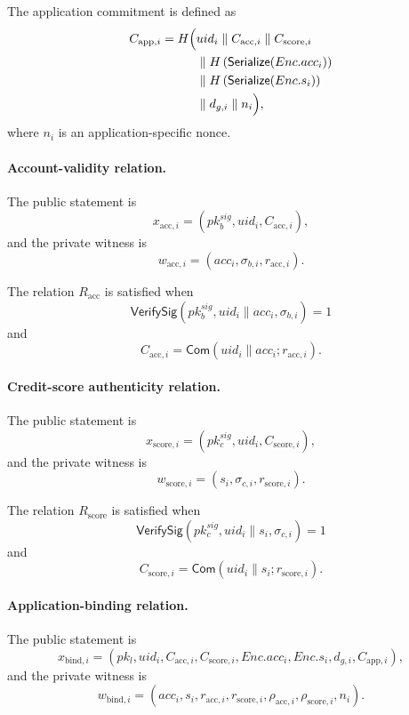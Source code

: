 \documentclass[a4paper,fleqn]{cas-dc}
\begin{document}
{The application commitment is defined as
\[
\begin{aligned}
C_{\mathrm{app},i}
=
H\Bigl(
    &uid_i
    \parallel C_{\mathrm{acc},i}
    \parallel C_{\mathrm{score},i} \\
    &\parallel H\left(\mathsf{Serialize}(Enc.acc_i)\right) \\
    &\parallel H\left(\mathsf{Serialize}(Enc.s_i)\right) \\
    &\parallel d_{g,i}
    \parallel n_i
\Bigr),
\end{aligned}
\]
where $n_i$ is an application-specific nonce.

\paragraph{Account-validity relation.}

The public statement is
\[
x_{\mathrm{acc},i}
=
\left(
pk_b^{sig},
uid_i,
C_{\mathrm{acc},i}
\right),
\]
and the private witness is
\[
w_{\mathrm{acc},i}
=
\left(
acc_i,
\sigma_{b,i},
r_{\mathrm{acc},i}
\right).
\]

The relation $R_{\mathrm{acc}}$ is satisfied when
\[
\mathsf{VerifySig}
\left(
pk_b^{sig},
uid_i \parallel acc_i,
\sigma_{b,i}
\right)
=
1
\]
and
\[
C_{\mathrm{acc},i}
=
\mathsf{Com}
\left(
uid_i \parallel acc_i;
r_{\mathrm{acc},i}
\right).
\]

\paragraph{Credit-score authenticity relation.}

The public statement is
\[
x_{\mathrm{score},i}
=
\left(
pk_c^{sig},
uid_i,
C_{\mathrm{score},i}
\right),
\]
and the private witness is
\[
w_{\mathrm{score},i}
=
\left(
s_i,
\sigma_{c,i},
r_{\mathrm{score},i}
\right).
\]

The relation $R_{\mathrm{score}}$ is satisfied when
\[
\mathsf{VerifySig}
\left(
pk_c^{sig},
uid_i \parallel s_i,
\sigma_{c,i}
\right)
=
1
\]
and
\[
C_{\mathrm{score},i}
=
\mathsf{Com}
\left(
uid_i \parallel s_i;
r_{\mathrm{score},i}
\right).
\]



\paragraph{Application-binding relation.}

The public statement is
\[
x_{\mathrm{bind},i}
=
\left(
pk_l,
uid_i,
C_{\mathrm{acc},i},
C_{\mathrm{score},i},
Enc.acc_i,
Enc.s_i,
d_{g,i},
C_{\mathrm{app},i}
\right),
\]
and the private witness is
\[
w_{\mathrm{bind},i}
=
\left(
acc_i,
s_i,
r_{\mathrm{acc},i},
r_{\mathrm{score},i},
\rho_{\mathrm{acc},i},
\rho_{\mathrm{score},i},
n_i
\right).
\]

}
\end{document}
